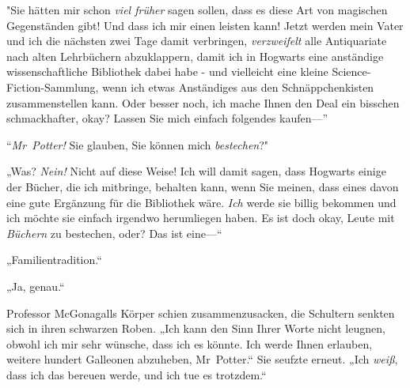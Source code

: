 "Sie hätten mir schon \emph{viel früher} sagen sollen, dass es diese Art von magischen Gegenständen gibt! Und dass ich mir einen leisten kann! Jetzt werden mein Vater und ich die nächsten zwei Tage damit verbringen, \emph{verzweifelt} alle Antiquariate nach alten Lehrbüchern abzuklappern, damit ich in Hogwarts eine anständige wissenschaftliche Bibliothek dabei habe - und vielleicht eine kleine Science-Fiction-Sammlung, wenn ich etwas Anständiges aus den Schnäppchenkisten zusammenstellen kann. Oder besser noch, ich mache Ihnen den Deal ein bisschen schmackhafter, okay? Lassen Sie mich einfach folgendes kaufen—”

“\emph{Mr~Potter!} Sie glauben, Sie können mich \emph{bestechen}?"

„Was? \emph{Nein!} Nicht auf diese Weise! Ich will damit sagen, dass Hogwarts einige der Bücher, die ich mitbringe, behalten kann, wenn Sie meinen, dass eines davon eine gute Ergänzung für die Bibliothek wäre. \emph{Ich} werde sie billig bekommen und ich möchte sie einfach irgendwo herumliegen haben. Es ist doch okay, Leute mit \emph{Büchern} zu bestechen, oder? Das ist eine—“

„Familientradition.“

„Ja, genau.“

Professor McGonagalls Körper schien zusammenzusacken, die Schultern senkten sich in ihren schwarzen Roben. „Ich kann den Sinn Ihrer Worte nicht leugnen, obwohl ich mir sehr wünsche, dass ich es könnte. Ich werde Ihnen erlauben, weitere hundert Galleonen abzuheben, Mr~Potter.“ Sie seufzte erneut. „Ich \emph{weiß}, dass ich das bereuen werde, und ich tue es trotzdem.“

